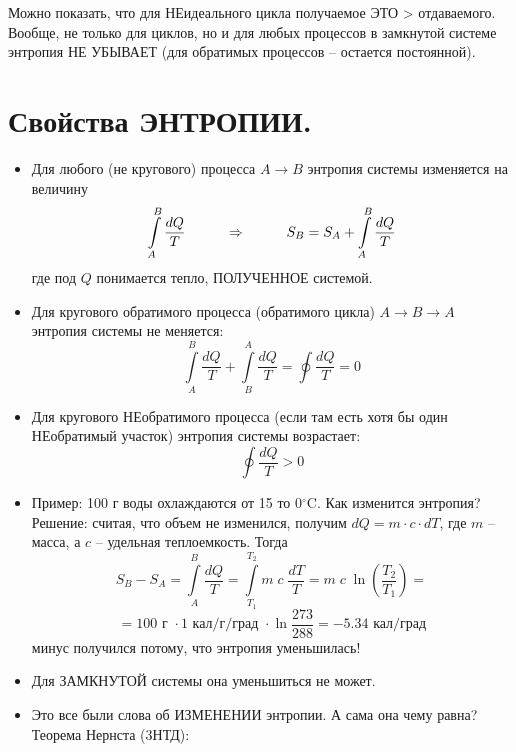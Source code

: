 Можно показать, что для НЕидеального цикла получаемое ЭТО > отдаваемого. Вообще, не только для циклов, но и для любых процессов в замкнутой системе энтропия НЕ УБЫВАЕТ (для обратимых процессов -- остается постоянной).

\section{Свойства ЭНТРОПИИ.}

\begin{itemize}
 \item Для любого (не кругового) процесса $A\rightarrow B$ энтропия системы изменяется на величину
     \begin{displaymath}
     \int\limits_A^B\frac{dQ}{T}\hspace{10mm}\Rightarrow\hspace{10mm}
     S_B=S_A+\int\limits_A^B\frac{dQ}{T}
     \end{displaymath}
     где под $Q$ понимается тепло, ПОЛУЧЕННОЕ системой.
 \item Для кругового обратимого процесса (обратимого цикла) $A\rightarrow B\rightarrow A$ энтропия системы не меняется:
     \begin{displaymath}
     \int\limits_A^B\frac{dQ}{T}+\int\limits_B^A\frac{dQ}{T}=\oint\frac{dQ}{T}=0
     \end{displaymath}
 \item Для кругового НЕобратимого процесса (если там есть хотя бы один НЕобратимый участок) энтропия системы возрастает:
     \begin{displaymath}
     \oint\frac{dQ}{T}>0
     \end{displaymath}
 \item Пример: 100 г воды охлаждаются от 15 то 0$^\circ$C. Как изменится энтропия?\\
     Решение: считая, что объем не изменился, получим $dQ=m\cdot c\cdot dT$, где $m$ -- масса, а $c$ -- удельная теплоемкость. Тогда
     \begin{displaymath}
     S_B-S_A=\int\limits_A^B\frac{dQ}{T}=\int\limits_{T_1}^{T_2}m\;c\;\frac{dT}{T}=
     m\;c\;\ln\left(\frac{T_2}{T_1}\right)=
     \end{displaymath}
     \begin{displaymath}
     =100\texttt{ г }\cdot1\texttt{ кал/г/град }\cdot\ln\frac{273}{288}=-5.34\texttt{ кал/град}
     \end{displaymath}
     минус получился потому, что энтропия уменьшилась!
  \item Для ЗАМКНУТОЙ системы она уменьшиться не может.
  \item Это все были слова об ИЗМЕНЕНИИ энтропии. А сама она чему равна? Теорема Нернста (3НТД):
      \begin{center}
      \end{center}
 \end{itemize}

